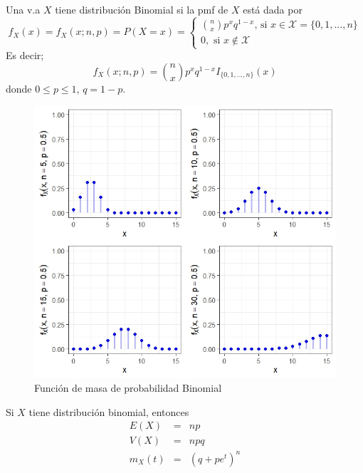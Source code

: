 \begin{i}
\begin{definition}
Una v.a $X$ tiene distribución Binomial si la pmf de $X$ está dada por 
\begin{equation*}
f_{X}(x)=f_{X}(x;n,p)=P(X=x)=\left\{ 
\begin{array}{l}
\binom{n}{x}p^{x}q^{1-x}\text{, si }x\in \mathcal{X}=\{0,1,...,n\} \\ 
0,\text{ si }x\notin \mathcal{X}%
\end{array}%
\right.
\end{equation*}%
Es decir;
\begin{equation*}
f_{X}(x;n,p)=\binom{n}{x}p^{x}q^{1-x}I_{\{0,1,...,n\}}(x)
\end{equation*}%
donde $0\leq p\leq 1$, $q=1-p$.
\end{definition}

\begin{figure}[h!]
\centering
\includegraphics[scale=1]{Figuras/Binomial.jpeg}
\caption{Función de masa de probabilidad Binomial}
\end{figure}

\begin{theorem}
Si $X$ tiene distribución binomial, entonces
\begin{eqnarray*}
E(X) &=&np \\
V(X) &=&npq \\
m_{X}(t) &=&\left( q+pe^{t}\right) ^{n}
\end{eqnarray*}
\end{theorem}


\end{i}
